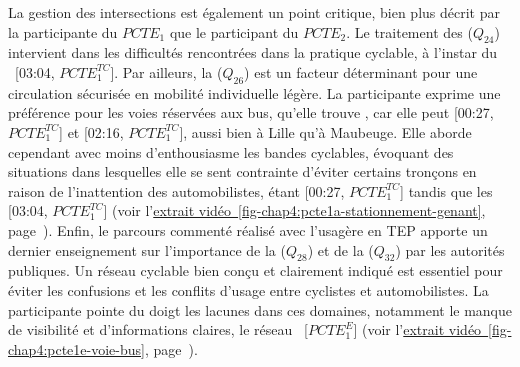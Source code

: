 \begin{refsegment}
La gestion des intersections est également un point critique, bien plus décrit par la participante du \(PCTE_{1}\) que le participant du \(PCTE_{2}\). Le traitement des  (\(Q_{24}\)) intervient dans les difficultés rencontrées dans la pratique cyclable, à l'instar du ~[03:04, \(PCTE^{TC}_{1}\)]. Par ailleurs, la  (\(Q_{26}\)) est un facteur déterminant pour une circulation sécurisée en mobilité individuelle légère. La participante exprime une préférence pour les voies réservées aux bus, qu'elle trouve , car elle peut  [00:27, \(PCTE^{TC}_{1}\)] et  [02:16, \(PCTE^{TC}_{1}\)], aussi bien à Lille qu'à Maubeuge. Elle aborde cependant avec moins d'enthousiasme les bandes cyclables, évoquant des situations dans lesquelles elle se sent contrainte d'éviter certains tronçons en raison de l'inattention des automobilistes, étant  [00:27, \(PCTE^{TC}_{1}\)] tandis que les  [03:04, \(PCTE^{TC}_{1}\)] (voir l'\hyperref[fig-chap4:pcte1a-stationnement-genant]{extrait vidéo~\ref{fig-chap4:pcte1a-stationnement-genant}}, page~\pageref{fig-chap4:pcte1a-stationnement-genant}). Enfin, le parcours commenté réalisé avec l'usagère en \acrshort{TEP} apporte un dernier enseignement sur l'importance de la  (\(Q_{28}\)) et de la  (\(Q_{32}\)) par les autorités publiques. Un réseau cyclable bien conçu et clairement indiqué est essentiel pour éviter les confusions et les conflits d'usage entre cyclistes et automobilistes. La participante pointe du doigt les lacunes dans ces domaines, notamment le manque de visibilité et d'informations claires, le réseau ~[\(PCTE^{E}_{1}\)] (voir l'\hyperref[fig-chap4:pcte1e-voie-bus]{extrait vidéo~\ref{fig-chap4:pcte1e-voie-bus}}, page~\pageref{fig-chap4:pcte1e-voie-bus}).%


\end{refsegment}
